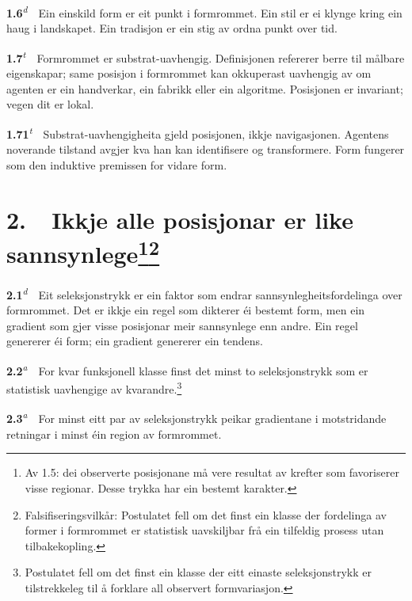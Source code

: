 \documentclass[10pt]{article}
\begin{document}
\noindent\textbf{1.6}\textsuperscript{\textit{d}}~~Ein einskild form er eit punkt i formrommet. Ein stil er ei klynge kring ein haug i landskapet. Ein tradisjon er ein stig av ordna punkt over tid.




\noindent\textbf{1.7}\textsuperscript{\textit{t}}~~Formrommet er substrat-uavhengig. Definisjonen refererer berre til målbare eigenskapar; same posisjon i formrommet kan okkuperast uavhengig av om agenten er ein handverkar, ein fabrikk eller ein algoritme. Posisjonen er invariant; vegen dit er lokal.




\noindent\textbf{1.71}\textsuperscript{\textit{t}}~~Substrat-uavhengigheita gjeld posisjonen, ikkje navigasjonen. Agentens noverande tilstand avgjer kva han kan identifisere og transformere. Form fungerer som den induktive premissen for vidare form.







\chapter*{2.~~Ikkje alle posisjonar er like sannsynlege\footnote{Av 1.5: dei observerte posisjonane må vere resultat av krefter som favoriserer visse regionar. Desse trykka har ein bestemt karakter.}\footnote{Falsifiseringsvilkår: Postulatet fell om det finst ein klasse der fordelinga av former i formrommet er statistisk uavskiljbar frå ein tilfeldig prosess utan tilbakekopling.}}




\noindent\textbf{2.1}\textsuperscript{\textit{d}}~~Eit seleksjonstrykk er ein faktor som endrar sannsynlegheitsfordelinga over formrommet. Det er ikkje ein regel som dikterer éi bestemt form, men ein gradient som gjer visse posisjonar meir sannsynlege enn andre. Ein regel genererer éi form; ein gradient genererer ein tendens.




\noindent\textbf{2.2}\textsuperscript{\textit{a}}~~For kvar funksjonell klasse finst det minst to seleksjonstrykk som er statistisk uavhengige av kvarandre.\footnote{Postulatet fell om det finst ein klasse der eitt einaste seleksjonstrykk er tilstrekkeleg til å forklare all observert formvariasjon.}




\noindent\textbf{2.3}\textsuperscript{\textit{a}}~~For minst eitt par av seleksjonstrykk peikar gradientane i motstridande retningar i minst éin region av formrommet.
\end{document}
